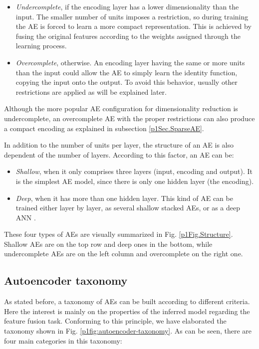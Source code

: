 \begin{itemize}
	\item \textit{Undercomplete}, if the encoding layer has a lower dimensionality than the input. The smaller number of units imposes a restriction, so during training the AE is forced to learn a more compact representation. This is achieved by fusing the original features according to the weights assigned through the learning process.
	
	\item \textit{Overcomplete}, otherwise. An encoding layer having the same or more units than the input could allow the AE to simply learn the identity function, copying the input onto the output. To avoid this behavior, usually other restrictions are applied as will be explained later.
\end{itemize}

Although the more popular AE configuration for dimensionality reduction is undercomplete, an overcomplete AE with the proper restrictions can also produce a compact encoding as explained in subsection \ref{p1Sec.SparseAE}.

In addition to the number of units per layer, the structure of an AE is also dependent of the number of layers. According to this factor, an AE can be:

\begin{itemize}
	\item \textit{Shallow}, when it only comprises three layers (input, encoding and output). It is the simplest AE model, since there is only one hidden layer (the encoding).
	
	\item \textit{Deep}, when it has more than one hidden layer. This kind of AE can be trained either layer by layer, as several shallow stacked AEs, or as a deep ANN .
\end{itemize}

These four types of AEs are visually summarized in Fig. \ref{p1Fig.Structure}. Shallow AEs are on the top row and deep ones in the bottom, while undercomplete AEs are on the left column and overcomplete on the right one.


\subsection{Autoencoder taxonomy}

As stated before, a taxonomy of AEs can be built according to different criteria. Here the interest is mainly on the properties of the inferred model regarding the feature fusion task. Conforming to this principle, we have elaborated the taxonomy shown in Fig. \ref{p1fig:autoencoder-taxonomy}. As can be seen, there are four main categories in this taxonomy:

